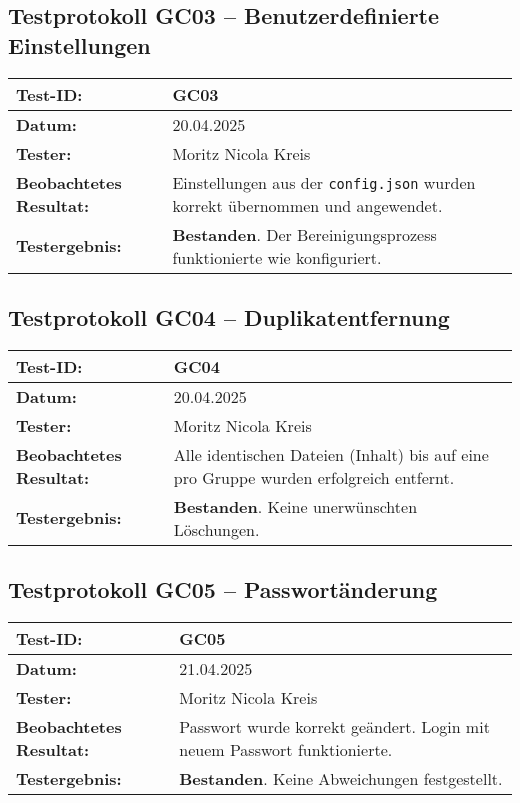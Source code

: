 \subsection*{Testprotokoll GC03 – Benutzerdefinierte Einstellungen}
\begin{tabular}{|p{4cm}|p{10cm}|}
\hline
\textbf{Test-ID:} & GC03 \\
\hline
\textbf{Datum:} & 20.04.2025 \\
\hline
\textbf{Tester:} & Moritz Nicola Kreis \\
\hline
\textbf{Beobachtetes \newline Resultat:} & Einstellungen aus der \texttt{config.json} wurden korrekt übernommen und angewendet. \\
\hline
\textbf{Testergebnis:} & \textbf{Bestanden}. Der Bereinigungsprozess funktionierte wie konfiguriert. \\
\hline
\end{tabular}

\vspace{1em}

\subsection*{Testprotokoll GC04 – Duplikatentfernung}
\begin{tabular}{|p{4cm}|p{10cm}|}
\hline
\textbf{Test-ID:} & GC04 \\
\hline
\textbf{Datum:} & 20.04.2025 \\
\hline
\textbf{Tester:} & Moritz Nicola Kreis \\
\hline
\textbf{Beobachtetes \newline Resultat:} & Alle identischen Dateien (Inhalt) bis auf eine pro Gruppe wurden erfolgreich entfernt. \\
\hline
\textbf{Testergebnis:} & \textbf{Bestanden}. Keine unerwünschten Löschungen. \\
\hline
\end{tabular}

\vspace{1em}

\subsection*{Testprotokoll GC05 – Passwortänderung}
\begin{tabular}{|p{4cm}|p{10cm}|}
\hline
\textbf{Test-ID:} & GC05 \\
\hline
\textbf{Datum:} & 21.04.2025 \\
\hline
\textbf{Tester:} & Moritz Nicola Kreis \\
\hline
\textbf{Beobachtetes \newline Resultat:} & Passwort wurde korrekt geändert. Login mit neuem Passwort funktionierte. \\
\hline
\textbf{Testergebnis:} & \textbf{Bestanden}. Keine Abweichungen festgestellt. \\
\hline
\end{tabular}
